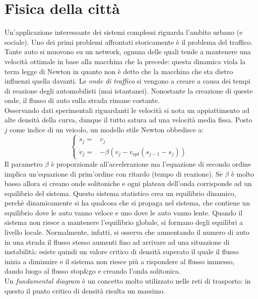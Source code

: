 \documentclass[12pt, a4paper]{book}
\theoremstyle{theorem}
\begin{document}
		\section{Fisica della città}
			Un'applicazione interessante dei sistemi complessi riguarda l'ambito urbano (e sociale).
			Uno dei primi problemi affrontati storicamente è il problema del traffico.
			Tante auto si muovono su un network, ognuna delle quali tende a mantenere una velocità ottimale in base alla macchina che la precede: questa dinamica viola la terza legge di Newton in quanto non è detto che la macchina che sta dietro influenzi quella davanti.
			Le \emph{onde di traffico} si vengono a creare a causa dei tempi di reazione degli automobilisti (mai istantanei).
			Nonostante la creazione di queste onde, il flusso di auto sulla strada rimane costante.\\
			Osservando dati sperimentali riguardanti le velocità si nota un appiattimento ad alte densità della curva, dunque il tutto satura ad una velocità media fissa.
			Posto $j$ come indice di un veicolo, un modello stile Newton obbedisce a:
			\begin{equation}
				\begin{cases}
					\dot{s}_j=&v_j\\
					\dot{v}_j=&-\beta\left(v_j-v_{opt}\left(s_{j-1}-s_j\right)\right)
				\end{cases}
				\label{equation:traffic}
			\end{equation}
			Il parametro $\beta$ è proporzionale all'accelerazione ma l'equazione di secondo ordine implica un'equazione di prim'ordine con ritardo (tempo di reazione).
			Se $\beta$ è molto basso allora si creano onde solitoniche  e ogni plateau dell'onda corrisponde ad un equilibrio del sistema.
			Questo sistema statistico crea un equilibrio dinamico, perchè dinamicamente si ha qualcosa che si propaga nel sistema, che contiene un equilibrio dove le auto vanno veloce e uno dove le auto vanno lente.
			Quando il sistema non riesce a mantenere l'equilibrio globale, si formano degli equilibri a livello locale.
			Normalmente, infatti, si osserva che aumentando il numero di auto in una strada il flusso stesso aumenti fino ad arrivare ad una situazione di instabilità: esiste quindi un valore critico di densità superato il quale il flusso inizia a diminuire e il sistema non riesce più a rispondere al flusso immesso, dando luogo al flusso stop\&go e creando l'onda solitonica.\\
			Un \emph{fundamental diagram} è un concetto molto utilizzato nelle reti di trasporto: in questo il punto critico di densità risulta un massimo.
\end{document}
